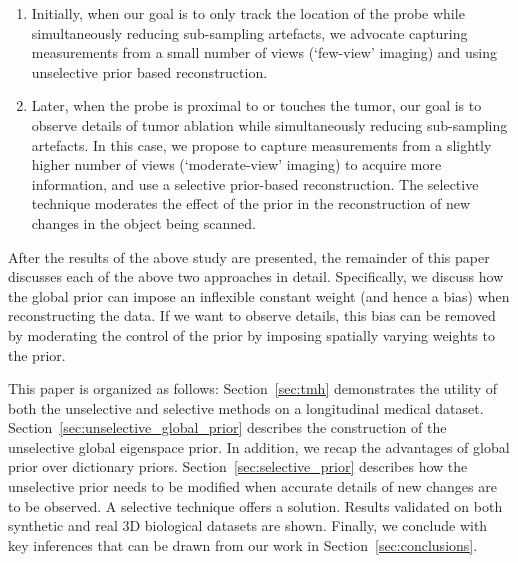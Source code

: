 \documentclass[journal]{IEEEtran}
\begin{document}
\begin{enumerate}
\item Initially, when our goal is to only track the location of the probe while simultaneously reducing sub-sampling artefacts, we advocate capturing measurements from a small number of views (`few-view' imaging) and using unselective prior based reconstruction. 
\item Later, when the probe is proximal to or touches the tumor, our goal is to observe details of tumor ablation while simultaneously reducing sub-sampling artefacts. In this case, we propose to capture measurements from a slightly higher number of views (`moderate-view' imaging) to acquire more information, and use a selective prior-based reconstruction. The selective technique moderates the effect of the prior in the reconstruction of new changes in the object being scanned.
\end{enumerate}
  
After the results of the above study are presented, the remainder of this paper discusses each of the above two approaches in detail. Specifically, we discuss how the global prior can impose an inflexible constant weight (and hence a bias) when reconstructing the data. If we want to observe details, this bias can be removed by moderating the control of the prior by imposing spatially varying weights to the prior. 

This paper is organized as follows: Section~\ref{sec:tmh} demonstrates the utility of both the unselective and selective methods on a longitudinal medical dataset. Section~\ref{sec:unselective_global_prior} describes the construction of the unselective global eigenspace prior. In addition, we recap the advantages of global prior over dictionary priors. Section~\ref{sec:selective_prior} describes how the unselective prior needs to be modified when accurate details of new changes are to be observed. A selective technique offers a solution. Results validated on both synthetic and real 3D biological datasets are shown. Finally, we conclude with key inferences that can be drawn from our work in Section~\ref{sec:conclusions}.


\end{document}
